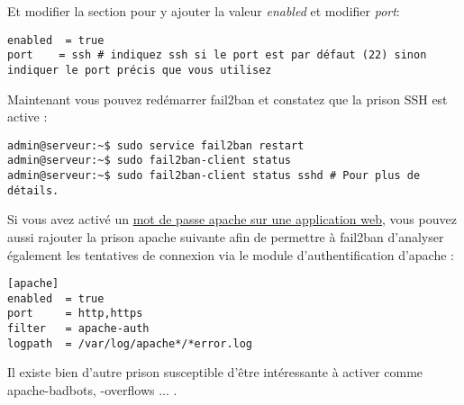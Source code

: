 Et modifier la section pour y ajouter la valeur \emph{enabled} et modifier \emph{port}: 
 \begin{verbatim}
enabled  = true
port    = ssh # indiquez ssh si le port est par défaut (22) sinon indiquer le port précis que vous utilisez
\end{verbatim}

Maintenant vous pouvez redémarrer fail2ban et constatez que la prison SSH est active : 
 \begin{verbatim}
admin@serveur:~$ sudo service fail2ban restart
admin@serveur:~$ sudo fail2ban-client status 
admin@serveur:~$ sudo fail2ban-client status sshd # Pour plus de détails.
\end{verbatim}

Si vous avez activé un \hyperref[MDP]{mot de passe apache sur une application web}, vous pouvez aussi rajouter la prison apache suivante afin de permettre à fail2ban d'analyser également les tentatives de connexion via le module d'authentification d'apache : 

\begin{verbatim}
[apache]
enabled  = true
port     = http,https
filter   = apache-auth
logpath  = /var/log/apache*/*error.log
\end{verbatim}
Il existe bien d'autre prison susceptible d'être intéressante à activer comme apache-badbots, -overflows ... .


